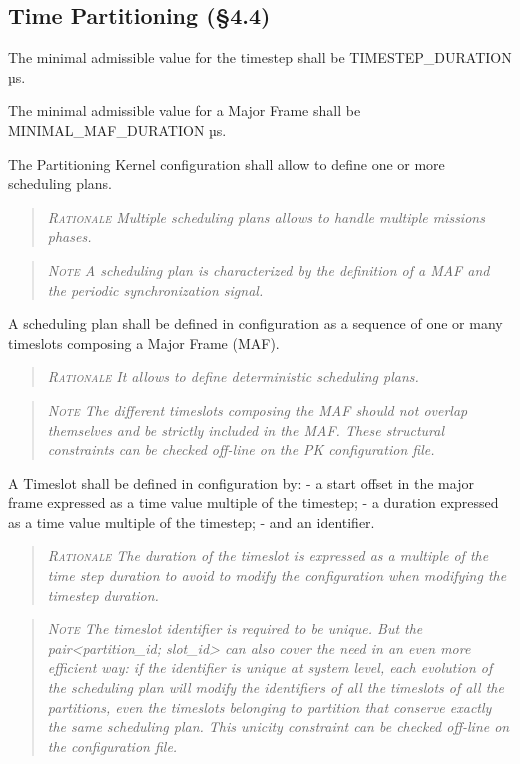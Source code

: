 \subsection{Time Partitioning (\S4.4)}

The minimal admissible value for the timestep shall be TIMESTEP\_DURATION µs.

The minimal admissible value for a Major Frame shall be MINIMAL\_MAF\_DURATION µs.

The Partitioning Kernel configuration shall allow to define one or more scheduling plans.
\begin{quote}\it
\textsc{Rationale}
Multiple scheduling plans allows to handle multiple missions phases.
\end{quote}
\begin{quote}\it
\textsc{Note}
A scheduling plan is characterized by the definition of a MAF and the periodic synchronization signal.
\end{quote}

A scheduling plan shall be defined in configuration as a sequence of one or many timeslots composing a Major Frame (MAF).
\begin{quote}\it
\textsc{Rationale}
It allows to define deterministic scheduling plans.
\end{quote}
\begin{quote}\it
\textsc{Note}
The different timeslots composing the MAF should not overlap themselves and be strictly included in the MAF. These structural constraints can be checked off-line on the PK configuration file.
\end{quote}

A Timeslot shall be defined in configuration by:
- a start offset in the major frame expressed as a time value multiple of the timestep;
- a duration expressed as a time value multiple of the timestep;
- and an identifier.
\begin{quote}\it
\textsc{Rationale}
The duration of the timeslot is expressed as a multiple of the time step duration to avoid to modify the configuration when modifying the timestep duration.
\end{quote}
\begin{quote}\it
\textsc{Note}
The timeslot identifier is required to be unique. But the pair<partition\_id; slot\_id> can also cover the need in an even more efficient way: if the identifier is unique at system level, each evolution of the scheduling plan will modify the identifiers of all the timeslots of all the partitions, even the timeslots belonging to partition that conserve exactly the same scheduling plan.
This unicity constraint can be checked off-line on the configuration file.
\end{quote}

